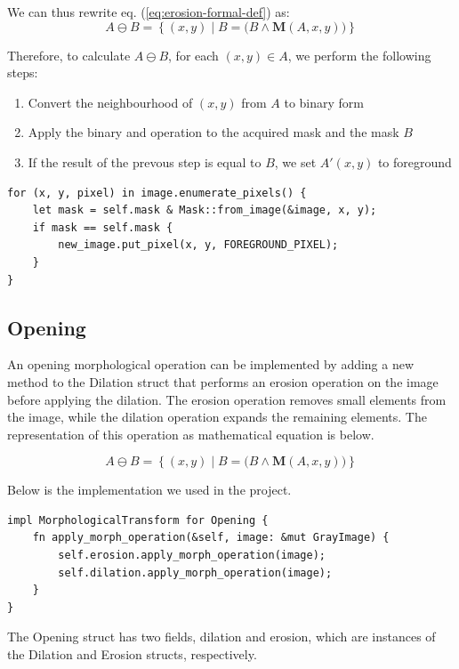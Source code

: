 \documentclass[12pt]{article}
\begin{document}
\pagebreak[2]
We can thus rewrite eq. (\ref{eq:erosion-formal-def}) as:
\begin{equation}
    A \ominus B = \left\{ (x,y) \mid B = \big( B \land \mathbf{M}(A,x,y) \big) \right\}
\end{equation}


Therefore, to calculate $A \ominus B$, for each $(x,y) \in A$, we perform the following steps:
\begin{enumerate}
    \item Convert the neighbourhood of $(x,y)$ from $A$ to binary form
    \item Apply the binary and operation to the acquired mask and the mask $B$
    \item If the result of the prevous step is equal to $B$, we set $A'(x,y)$ to foreground
\end{enumerate}

\pagebreak[3]
\begin{lstlisting}
for (x, y, pixel) in image.enumerate_pixels() {
    let mask = self.mask & Mask::from_image(&image, x, y);
    if mask == self.mask {
        new_image.put_pixel(x, y, FOREGROUND_PIXEL);
    }
}
\end{lstlisting}

\subsection{Opening}
An opening morphological operation can be implemented by adding a new method to the Dilation struct that performs an erosion operation on the image before applying the dilation. The erosion operation removes small elements from the image, while the dilation operation expands the remaining elements. The representation of this operation as mathematical equation is below.

\begin{equation}
    A \ominus B = \left\{ (x,y) \mid B = \big( B \land \mathbf{M}(A,x,y) \big) \right\}
\end{equation}

Below is the implementation we used in the project.
\begin{lstlisting}
impl MorphologicalTransform for Opening {
    fn apply_morph_operation(&self, image: &mut GrayImage) {
        self.erosion.apply_morph_operation(image);
        self.dilation.apply_morph_operation(image);
    }
}
\end{lstlisting}
The Opening struct has two fields, dilation and erosion, which are instances of the Dilation and Erosion structs, respectively. 
\end{document}
